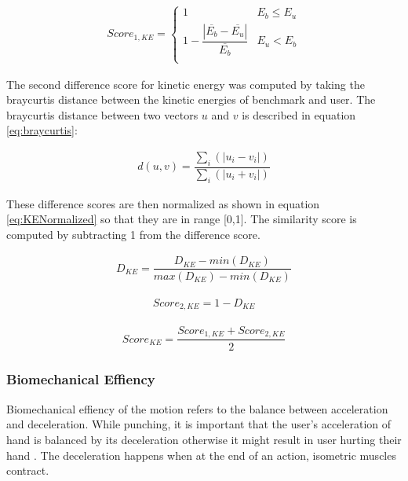 \begin{gather}
  Score_{1,KE} = 
  \begin{cases}
    1 & E_b \leq E_u \\
    1 - \dfrac{|\overline{E_b} - \overline{E_u}|} { \overline{E_b}} & E_u < E_b \\
\end{cases}
  \label{eq:KEScore}
\end{gather}

The second difference score for kinetic energy was computed by taking the braycurtis distance between the kinetic energies of benchmark and user. The braycurtis distance between two vectors $u$ and $v$ is described in equation \ref{eq:braycurtis}:

\begin{align}
  d(u,v) = \dfrac{\sum_i (|u_i - v_i|)}{\sum_i (|u_i + v_i|)}
  \label{eq:braycurtis}
\end{align}


These difference scores are then normalized as shown in equation \ref{eq:KENormalized} so that they are in range [0,1]. The similarity score is computed by subtracting 1 from the difference score. 

\begin{align}
  D_{KE} = \dfrac{D_{KE} - min(D_{KE})}{max(D_{KE})-min(D_{KE})}
  \label{eq:KENormalized}
\end{align}

\begin{align}
  Score_{2,KE} = 1- D_{KE}
\end{align}

\begin{align}
  Score_{KE} = \dfrac{Score_{1,KE}+Score_{2,KE}}{2}
  \label{eq:overallKEScore}
\end{align}

\subsubsection{Biomechanical Effiency}
Biomechanical effiency of the motion refers to the balance between acceleration and deceleration. While punching, it is important that the user's acceleration of hand is balanced by its deceleration otherwise it might result in user hurting their hand \cite{movementQuality,scoringMultimodal}. The deceleration happens when at the end of an action, isometric muscles contract. 


